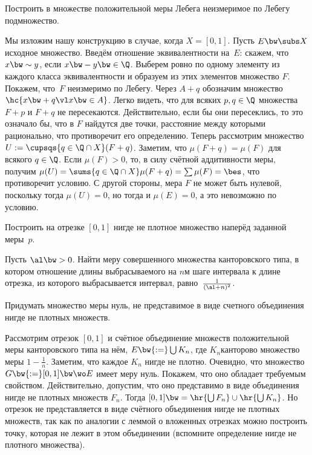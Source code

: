 \documentclass[a4paper,draft]{article}
\begin{document}
\begin{problem}\label{unmes.set.in.set.with.positive.measure}
  Построить в множестве положительной меры Лебега неизмеримое по Лебегу подмножество.
\end{problem}
\begin{solution}
  Мы изложим нашу конструкцию в случае, когда $X = [0,1]$.
  Пусть $E \bw\subs X$\т исходное множество. Введём отношение эквивалентности на~$E$:
  скажем, что $x \bw\sim y$, если $x \bw- y \bw\in \Q$. Выберем ровно по одному элементу из
  каждого класса эквивалентности и образуем из этих элементов множество $F$. Покажем, что~$F$
  неизмеримо по Лебегу. Через $A + q$ обозначим множество $\hc{x \bw+ q \vl x \bw\in A}$.
  Легко видеть, что для всяких $p,q \in \Q$ множества $F + p$ и $F + q$ не пересекаются.
  Действительно, если бы они пересеклись, то это означало бы, что в $F$ найдутся две точки,
  расстояние между которыми рационально, что противоречит его определению. Теперь рассмотрим
  множество $U := \cupsqs{q \in \Q \cap X}(F+q)$. Заметим, что $\mu(F + q) = \mu(F)$ для
  всякого $q\in \Q$. Если $\mu(F) > 0$, то, в силу счётной аддитивности меры, получим
  $\mu(U) = \sums{q \in \Q\cap X} \mu (F+q) = \sum \mu(F) = \bes$, что противоречит условию.
  С другой стороны, мера $F$ не может быть нулевой, поскольку тогда $\mu(U) = 0$, но тогда
  и $\mu(E) = 0$, а это невозможно по условию.
\end{solution}

\begin{problem}
  Построить на отрезке $[0,1]$ нигде не плотное множество наперёд заданной меры~$p$.
\end{problem}

\begin{problem}
  Пусть $\al \bw> 0$. Найти меру совершенного множества канторовского типа, в котором отношение
  длины выбрасываемого на $n$\д м шаге интервала к длине отрезка, из которого выбрасывается интервал,
  равно~$\frac{1}{(\al + n)^2}$.
\end{problem}

\begin{problem}
  Придумать множество меры нуль, не представимое в виде счетного объединения нигде не
  плотных множеств.
\end{problem}
\begin{solution}
  Рассмотрим отрезок $[0,1]$ и счётное объединение множеств положительной меры канторовского
  типа на нём,  $E\bw{:=}\bigcup K_n$, где $K_n$\т канторово множество меры $1-\frac{1}{n}$.
  Заметим, что каждое $K_n$ нигде не плотно. Очевидно, что множество $G \bw{:=} [0,1] \bw\wo E$
  имеет меру нуль. Покажем, что оно обладает требуемым свойством. Действительно, допустим, что
  оно представимо в виде объединения нигде не плотных множеств $F_n$. Тогда
  $[0,1]\bw=\hr{\bigcup F_n} \cup \hr{\bigcup K_n}$. Но отрезок не представляется в виде
  счётного объединения нигде не плотных множеств, так как по аналогии с леммой о вложенных
  отрезках можно построить точку, которая не лежит в этом объединении (вспомните
  определение нигде не плотного множества).
\end{solution}
\end{document}
